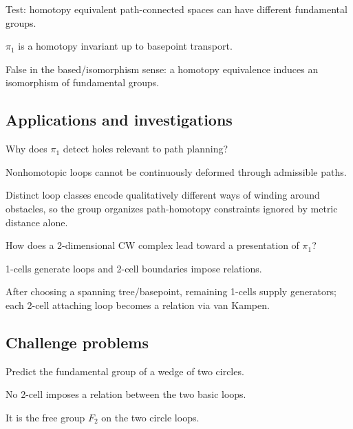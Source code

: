 \begin{exercise}\label{exr:viii09-ped-12}
Test: homotopy equivalent path-connected spaces can have different fundamental groups.
\end{exercise}
\begin{hint}
$\pi_1$ is a homotopy invariant up to basepoint transport.
\end{hint}
\begin{solution}
False in the based/isomorphism sense: a homotopy equivalence induces an isomorphism of fundamental groups.
\end{solution}

\subsection*{Applications and investigations}

\begin{exercise}\label{exr:viii09-ped-13}
Why does $\pi_1$ detect holes relevant to path planning?
\end{exercise}
\begin{hint}
Nonhomotopic loops cannot be continuously deformed through admissible paths.
\end{hint}
\begin{solution}
Distinct loop classes encode qualitatively different ways of winding around obstacles, so the group organizes path-homotopy constraints ignored by metric distance alone.
\end{solution}

\begin{exercise}\label{exr:viii09-ped-14}
How does a 2-dimensional CW complex lead toward a presentation of $\pi_1$?
\end{exercise}
\begin{hint}
1-cells generate loops and 2-cell boundaries impose relations.
\end{hint}
\begin{solution}
After choosing a spanning tree/basepoint, remaining 1-cells supply generators; each 2-cell attaching loop becomes a relation via van Kampen.
\end{solution}

\subsection*{Challenge problems}

\begin{exercise}\label{exr:viii09-ped-15}
Predict the fundamental group of a wedge of two circles.
\end{exercise}
\begin{hint}
No 2-cell imposes a relation between the two basic loops.
\end{hint}
\begin{solution}
It is the free group $F_2$ on the two circle loops.
\end{solution}

